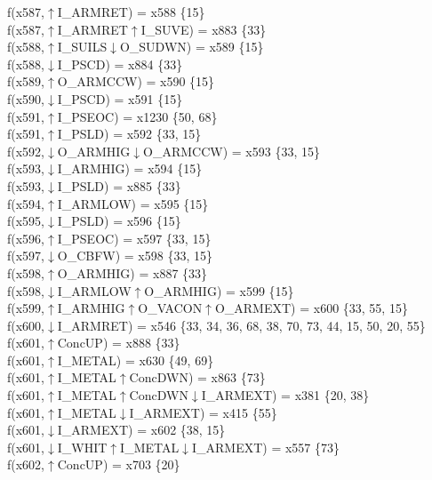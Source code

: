 f(x587,$\uparrow$I\_ARMRET) = x588 \{15\} \\  
f(x587,$\uparrow$I\_ARMRET$\uparrow$I\_SUVE) = x883 \{33\} \\  
f(x588,$\uparrow$I\_SUILS$\downarrow$O\_SUDWN) = x589 \{15\} \\  
f(x588,$\downarrow$I\_PSCD) = x884 \{33\} \\  
f(x589,$\uparrow$O\_ARMCCW) = x590 \{15\} \\  
f(x590,$\downarrow$I\_PSCD) = x591 \{15\} \\  
f(x591,$\uparrow$I\_PSEOC) = x1230 \{50, 68\} \\  
f(x591,$\uparrow$I\_PSLD) = x592 \{33, 15\} \\  
f(x592,$\downarrow$O\_ARMHIG$\downarrow$O\_ARMCCW) = x593 \{33, 15\} \\  
f(x593,$\downarrow$I\_ARMHIG) = x594 \{15\} \\  
f(x593,$\downarrow$I\_PSLD) = x885 \{33\} \\  
f(x594,$\uparrow$I\_ARMLOW) = x595 \{15\} \\  
f(x595,$\downarrow$I\_PSLD) = x596 \{15\} \\  
f(x596,$\uparrow$I\_PSEOC) = x597 \{33, 15\} \\  
f(x597,$\downarrow$O\_CBFW) = x598 \{33, 15\} \\  
f(x598,$\uparrow$O\_ARMHIG) = x887 \{33\} \\  
f(x598,$\downarrow$I\_ARMLOW$\uparrow$O\_ARMHIG) = x599 \{15\} \\  
f(x599,$\uparrow$I\_ARMHIG$\uparrow$O\_VACON$\uparrow$O\_ARMEXT) = x600 \{33, 55, 15\} \\  
f(x600,$\downarrow$I\_ARMRET) = x546 \{33, 34, 36, 68, 38, 70, 73, 44, 15, 50, 20, 55\} \\  
f(x601,$\uparrow$ConcUP) = x888 \{33\} \\  
f(x601,$\uparrow$I\_METAL) = x630 \{49, 69\} \\  
f(x601,$\uparrow$I\_METAL$\uparrow$ConcDWN) = x863 \{73\} \\  
f(x601,$\uparrow$I\_METAL$\uparrow$ConcDWN$\downarrow$I\_ARMEXT) = x381 \{20, 38\} \\  
f(x601,$\uparrow$I\_METAL$\downarrow$I\_ARMEXT) = x415 \{55\} \\  
f(x601,$\downarrow$I\_ARMEXT) = x602 \{38, 15\} \\  
f(x601,$\downarrow$I\_WHIT$\uparrow$I\_METAL$\downarrow$I\_ARMEXT) = x557 \{73\} \\  
f(x602,$\uparrow$ConcUP) = x703 \{20\} \\  
